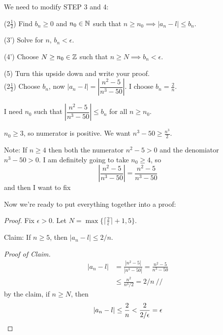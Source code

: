 \documentclass[twoside]{scrartcl}
\begin{document}
	We need to modify STEP 3 and 4: 
	
	(2$\frac{1}{2}$) Find $b_n \geq 0$ and $n_0 \in\mathbb{N}$ such that $n \geq n_0 \implies |a_n -l| \leq b_n$. 
	
	(3') Solve for $n$, $b_n < \epsilon$.
	
	(4') Choose $N \geq n_0 \in \mathbb{Z}$ such that $n \geq N \implies b_n <\epsilon$. 
	
	(5) Turn this upside down and write your proof.\\
	
	(2$\frac{1}{2}$) Choose $b_n$, now $|a_n -l| = \left|\dfrac{n^2-5}{n^3-50}\right|$. I choose $b_n = \frac{2}{n}$.
	
	 I need $n_0$ such that $ \left|\dfrac{n^2-5}{n^3-50}\right| \leq b_n$ for all $n \geq n_0$. 
	
	$n_0 \geq 3$, so numerator is positive. We want $n^3 - 50 \geq \frac{n^3}{2}$. 
	
	Note: If $n \geq 4$ then both the numerator $n^2 -5 >0$ and the denomiator $n^3 - 50 > 0$. I am definitely going to take $n_0 \geq 4$, so 
	\[\left|\frac{n^2-5}{n^3-50}\right| = \frac{n^2-5}{n^3-50}\]
	and then I want to fix 
	
	
	
	Now we're ready to put everything together into a proof: 
	
	\begin{proof} Fix $\epsilon > 0$. Let $N = \max\{\lceil \frac{2}{\epsilon} \rceil + 1,5\}$.
	
	Claim: If $n \geq 5$, then $|a_n - l| \leq 2/n$.
	
	\textit{Proof of Claim.}
	\[
	\begin{aligned}
|a_n - l| &= \frac{|n^2-5|}{|n^3-50|} = \frac{n^2 - 5}{n^3-50} \\
& \leq \frac{n^2}{n^3/2} = 2/n ~//	
\end{aligned}
\]	
by the claim, if $n \geq N$, then 
\[|a_n - l| \leq \frac{2}{n} < \frac{2}{2/\epsilon} = \epsilon \qedhere\]
\end{proof}\vspace*{20pt}

  
  \theend
  
\end{document}
